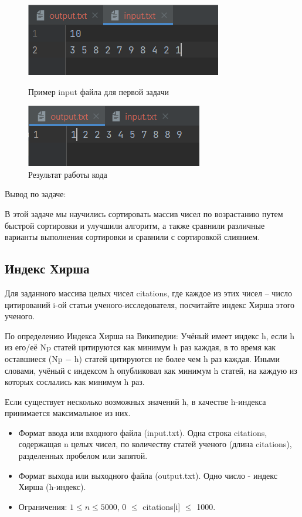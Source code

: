 \begin{figure}[H]
	\begin{center}
		\includegraphics[scale=1]{fig/input1.png}
		\caption{Пример input файла для первой задачи}
		\label{pic:input1} %
	\end{center}
        \begin{center}
		\includegraphics[scale=1.1]{fig/output1.png}
		\caption{Результат работы кода}
		\label{pic:output1} %
	\end{center}
\end{figure}

Вывод по задаче:

В этой задаче мы научились сортировать массив чисел по возрастанию путем быстрой сортировки и улучшили алгоритм, а также сравнили различные варианты выполнения сортировки и сравнили с сортировкой слиянием.

\subsection{Индекс Хирша}
Для заданного массива целых чисел citations, где каждое из этих чисел – число цитирований i-ой статьи ученого-исследователя, посчитайте индекс Хирша этого ученого.

По определению Индекса Хирша на Википедии: Учёный имеет индекс h, если h из его/её Np статей цитируются как минимум h раз каждая, в то время как оставшиеся (Np − h) статей цитируются не более чем h раз каждая. Иными словами, учёный с индексом h опубликовал как минимум h статей, на каждую из которых сослались как минимум h раз.

Если существует несколько возможных значений h, в качестве h-индекса принимается максимальное из них.

\begin{itemize}
	\item Формат ввода или входного файла (input.txt). Одна строка citations, содержащая n целых чисел, по количеству статей ученого (длина citations), разделенных пробелом или запятой.

	\item Формат выхода или выходного файла (output.txt). Одно число - индекс Хирша (h-индекс).

	\item Ограничения: $1 \le n \le 5000$, 0 $\le$ citations[i] $\le$ 1000.
\end{itemize}

